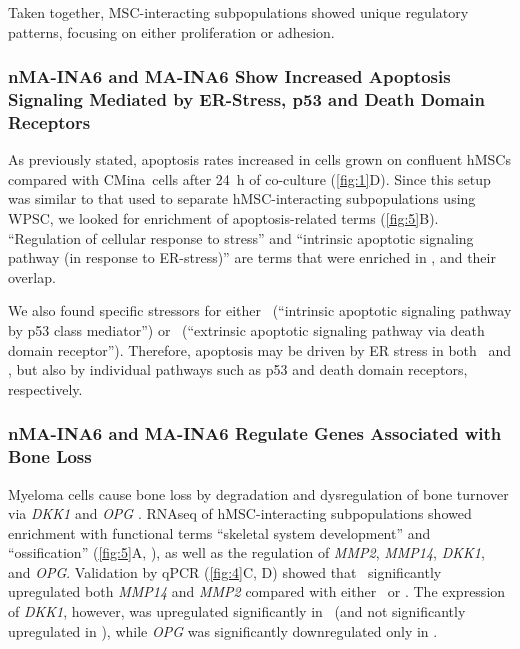 Taken together, MSC-interacting subpopulations showed unique regulatory
patterns, focusing on either proliferation or adhesion.


\subsubsection*{nMA-INA6 and MA-INA6 Show Increased Apoptosis Signaling Mediated
    by ER-Stress, p53 and Death Domain Receptors}%
\label{C1:results:RNAseq:apoptosis}%
As previously stated, apoptosis rates increased in \INA cells grown on confluent
hMSCs compared with \ac{CMina}\ cells after \SI{24}{\hour} of co-culture
(\autoref{fig:1}D). Since this setup was similar to that used to separate
hMSC-interacting subpopulations using WPSC, we looked for enrichment of
apoptosis-related terms (\autoref{fig:5}B). “Regulation of cellular response to
stress” and “intrinsic apoptotic signaling pathway (in response to ER-stress)”
are terms that were enriched in ,  and their
overlap.




We also found specific stressors for either \nMAina\ (“intrinsic
apoptotic signaling pathway by p53 class mediator”) or \MAina\ (“extrinsic
apoptotic signaling pathway via death domain receptor”). Therefore, apoptosis
may be driven by ER stress in both \nMAina\ and \MAina, but also by individual
pathways such as p53 and death domain receptors, respectively.


\subsubsection*{nMA-INA6 and MA-INA6 Regulate Genes Associated with Bone Loss}%
\label{C1:results:RNAseq:bone_loss}%
Myeloma cells cause bone loss by degradation and dysregulation of bone turnover
via \textit{DKK1} and \textit{OPG}
\cite{standalOsteoprotegerinBoundInternalized2002,vanvalckenborghMultifunctionalRoleMatrix2004,zhouDickkopf1KeyRegulator2013}.
RNAseq of hMSC-interacting subpopulations showed enrichment with functional
terms ``skeletal system development'' and ``ossification'' (\autoref{fig:5}A,
), as well as the regulation of
\textit{MMP2}, \textit{MMP14}, \textit{DKK1}, and \textit{OPG}. Validation by
qPCR (\autoref{fig:4}C, D) showed that \MAina\ significantly upregulated both
\textit{MMP14} and \textit{MMP2} compared with either \nMAina\ or \CMina. The
expression of \textit{DKK1}, however, was upregulated significantly in \nMAina\
(and not significantly upregulated in \MAina), while \textit{OPG} was
significantly downregulated only in \nMAina.

